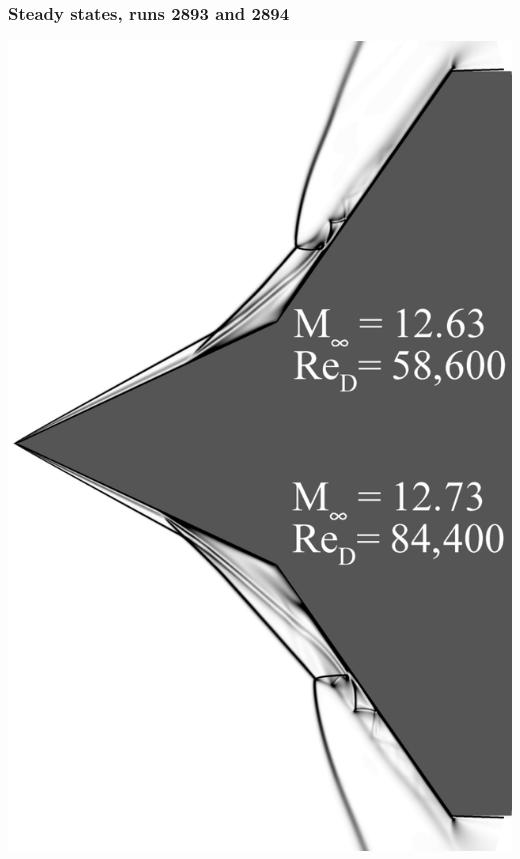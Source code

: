 \documentclass[compress,11pt]{beamer}
\begin{document}
\frame
{
  \frametitle{\scriptsize Steady states, runs 2893 and 2894}
  \begin{center}
    \includegraphics[height=.85\textheight]{figures/2893_2894_composite_schlieren}
    \hspace{2em}

\end{center}}
\end{document}
